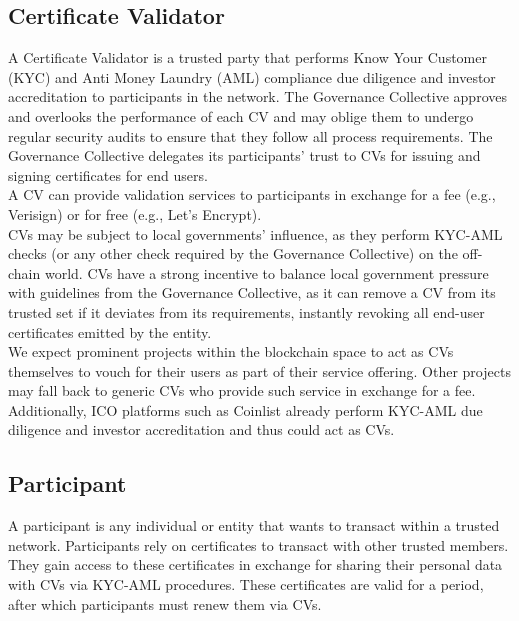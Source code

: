 \documentclass[10pt]{article}
\begin{document}
\subsection{Certificate Validator}

A Certificate Validator is a trusted party that performs Know Your Customer (KYC) and Anti Money Laundry (AML) compliance due diligence and investor accreditation to participants in the network. The Governance Collective approves and overlooks the performance of each CV and may oblige them to undergo regular security audits to ensure that they follow all process requirements. The Governance Collective delegates its participants’ trust to CVs for issuing and signing certificates for end users.  \\

\noindent A CV can provide validation services to participants in exchange for a fee (e.g., Verisign\cite{verisign}) or for free (e.g., Let’s Encrypt\cite{letsencrypt}). \\

\noindent CVs may be subject to local governments’ influence, as they perform KYC-AML checks (or any other check required by the Governance Collective) on the off-chain world. CVs have a strong incentive to balance local government pressure with guidelines from the Governance Collective, as it can remove a CV from its trusted set if it deviates from its requirements, instantly revoking all end-user certificates emitted by the entity. \\

\noindent We expect prominent projects within the blockchain space to act as CVs themselves to vouch for their users as part of their service offering. Other projects may fall back to generic CVs who provide such service in exchange for a fee. Additionally, ICO platforms such as Coinlist already perform KYC-AML due diligence and investor accreditation and thus could act as CVs.

\subsection{Participant}

A participant is any individual or entity that wants to transact within a trusted network. Participants rely on certificates to transact with other trusted members. They gain access to these certificates in exchange for sharing their personal data with CVs via KYC-AML procedures. These certificates are valid for a period, after which participants must renew them via CVs. \\
\end{document}
